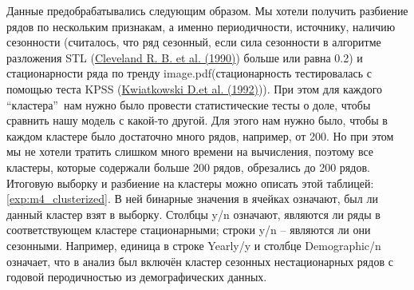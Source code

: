 \documentclass[a4paper,14pt]{extarticle}
\newcommand{\bibref}[3]{\hyperlink{#1}{#2 (#3)}} %
\begin{document}
	Данные предобрабатывались следующим образом. Мы хотели получить разбиение рядов по нескольким признакам, а именно периодичности, источнику, наличию сезонности (считалось, что ряд сезонный, если сила сезонности в алгоритме разложения STL (\bibref{cleveland90}{Cleveland R. B. et al.}{1990}) больше или равна 0.2) и стационарности ряда по тренду image.pdf(стационарность тестировалась с помощью теста KPSS (\bibref{kwiatkowski92}{Kwiatkowski D.et al.}{1992})). При этом для каждого \textquotedblleft кластера\textquotedblright\ нам нужно было провести статистические тесты о доле, чтобы сравнить нашу модель с какой-то другой. Для этого нам нужно было, чтобы в каждом кластере было достаточно много рядов, например, от 200. Но при этом мы не хотели тратить слишком много времени на вычисления, поэтому все кластеры, которые содержали больше 200 рядов, обрезались до 200 рядов. Итоговую выборку и разбиение на кластеры можно описать этой таблицей: \ref{exp:m4_clusterized}. В ней бинарные значения в ячейках означают, был ли данный кластер взят в выборку. Столбцы y/n означают, являются ли ряды в соответствующем кластере стационарными; строки y/n -- являются ли они сезонными. Например, единица в строке Yearly/y и столбце Demographic/n означает, что в анализ был включён кластер сезонных нестационарных рядов с годовой перодичностью из демографических данных.
\end{document}
